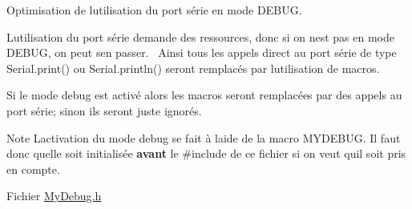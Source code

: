 Optimisation de l\textquotesingle{}utilisation du port série en mode DEBUG.

L\textquotesingle{}utilisation du port série demande des ressources, donc si on n\textquotesingle{}est pas en mode DEBUG, on peut s\textquotesingle{}en passer.~\newline
 Ainsi tous les appels direct au port série de type Serial.\+print() ou Serial.\+println() seront remplacés par l\textquotesingle{}utilisation de macros.

Si le mode debug est activé alors les macros seront remplacées par des appels au port série; sinon ils seront juste ignorés.

\begin{DoxyNote}{Note}
L\textquotesingle{}activation du mode debug se fait à l\textquotesingle{}aide de la macro MYDEBUG. Il faut donc qu\textquotesingle{}elle soit initialisée {\bfseries{avant}} le \#include de ce fichier si on veut qu\textquotesingle{}il soit pris en compte.
\end{DoxyNote}
Fichier \mbox{\hyperlink{_my_debug_8h}{My\+Debug.\+h}} 